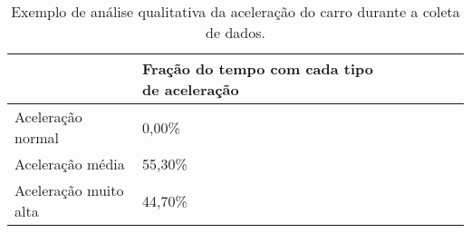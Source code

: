\begin{table}[]

    \caption{Exemplo de análise qualitativa da aceleração do carro durante a coleta de dados.}
    \label{Tb:tab_fracao_acc}
    \centering

    \begin{center}
        \begin{tabular}{ccc p{6cm} ccc}
            
            \multicolumn{1}{l}{}  & \multicolumn{1}{|l}{
                \textbf{Fração do tempo com cada tipo de aceleração}
            }  \\
            

            \hline
            
            \multicolumn{1}{l|}{Aceleração normal}  & \multicolumn{1}{|l}{0,00\%}    \\

            \hline
            
            \multicolumn{1}{l|}{Aceleração média}  & \multicolumn{1}{|l}{55,30\%}    \\

            \hline
            
            \multicolumn{1}{l|}{Aceleração muito alta}  & \multicolumn{1}{|l}{44,70\%}    \\
        \end{tabular}
    \end{center}
\end{table}
